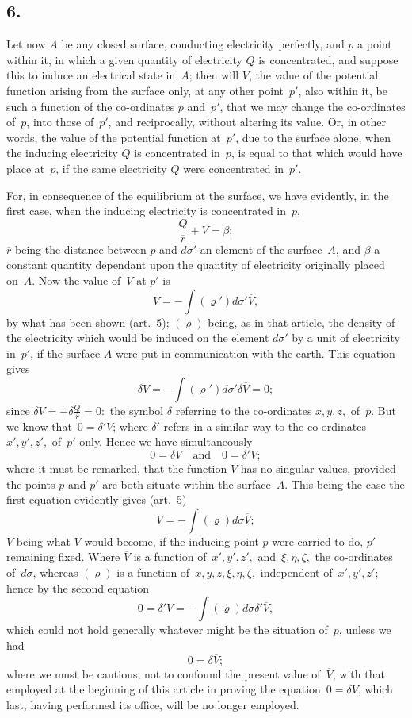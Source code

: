 \documentclass[12pt,notitlepage]{amsart}
\newcommand\Section[1]{\subsection{{#1}}}
\renewcommand{\rho}{\varrho}
\begin{document}
\Section{6.}
Let now $A$ be any closed surface, conducting electricity perfectly,
and $p$ a point within it, in which a given quantity of
electricity $Q$ is concentrated,
and suppose this to induce an electrical state in~$A$; then will $V$,
the value of the potential function arising from the surface only, at any other
point~$p'$, also within it,
be such a function of the co-ordinates $p$ and~$p'$, that
we may change the co-ordinates of~$p$,
into those of~$p'$, and reciprocally, without
altering its value. Or, in other words,
the value of the potential function at~$p'$,
due to the surface alone,
when the inducing electricity $Q$ is concentrated in~$p$,
is equal to that which would have place at~$p$,
if the same electricity $Q$ were
concentrated in~$p'$.

For, in consequence of the equilibrium at the surface, we have evidently,
in the first case, when the inducing electricity is concentrated in~$p$,
\[
\frac{Q}{\overline{r}}+\overline{V}=\beta;
\]
$\overline{r}$ being the distance between $p$ and $d\sigma'$
an element of the surface~$A$, and $\beta$
a constant quantity dependant upon the quantity of electricity originally placed
on~$A$. Now the value of~$V$ at $p'$ is
\[
V=-\int(\rho')d\sigma'\overline{V},
\]
by what has been shown (art.~5);
$(\rho)$ being, as in that article, the density
of the electricity which would be induced
on the element $d\sigma'$ by a unit of
electricity in~$p'$, if the surface $A$
were put in communication with the earth.
This equation gives
\[
\delta V=-\int(\rho')d\sigma'\delta\overline{V}=0;
\]
since $\delta\overline{V}=-\delta\frac{Q}{\overline{r}}=0:$
the symbol $\delta$ referring to the co-ordinates $x,y,z,$
of~$p$. But we know that~$0=\delta'V$;
where $\delta'$ refers in a similar way to the
co-ordinates $x',y',z',$ of~$p'$ only. Hence we have simultaneously
\[
0=\delta V \quad\text{and}\quad 0=\delta'V;
\]
where it must be remarked,
that the function $V$ has no singular values, provided
the points $p$ and $p'$ are both situate within the surface~$A$. This being
the case the first equation evidently gives (art.~5)
\[
V=-\int(\rho)d\sigma\overline{V};
\]
$\overline{V}$ being what $V$ would become,
if the inducing point $p$ were carried to do,
$p'$ remaining fixed. Where $\overline{V}$ is
a function of~$x',y',z',$ and~$\xi,\eta,\zeta,$ the
co-ordinates of~$d\sigma$, whereas $(\rho)$
is a function of~$x,y,z,\xi,\eta,\zeta,$ independent
of~$x',y',z'$; hence by the second equation
\[
0=\delta'V=-\int(\rho)d\sigma\delta'\overline{V},
\]
which could not hold generally whatever might be the situation of~$p$, unless
we had
\[
0=\delta\overline{V};
\]
where we must be cautious, not to confound the present value
of~$\overline{V}$, with
that employed at the beginning of this article in proving
the equation~${0=\delta V}$,
which last, having performed its office, will be no longer employed.
\end{document}
